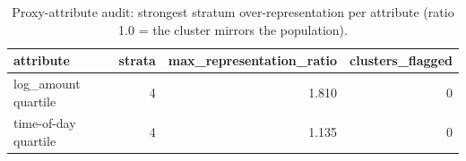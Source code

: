 \begin{table}[htbp]
\centering
\begin{tabular}{lrrr}
\toprule
attribute & strata & max\_representation\_ratio & clusters\_flagged \\
\midrule
log\_amount quartile & 4 & 1.810 & 0 \\
time-of-day quartile & 4 & 1.135 & 0 \\
\bottomrule
\end{tabular}
\caption{Proxy-attribute audit: strongest stratum over-representation per attribute (ratio 1.0 = the cluster mirrors the population).}
\label{tab:fairness}
\end{table}
